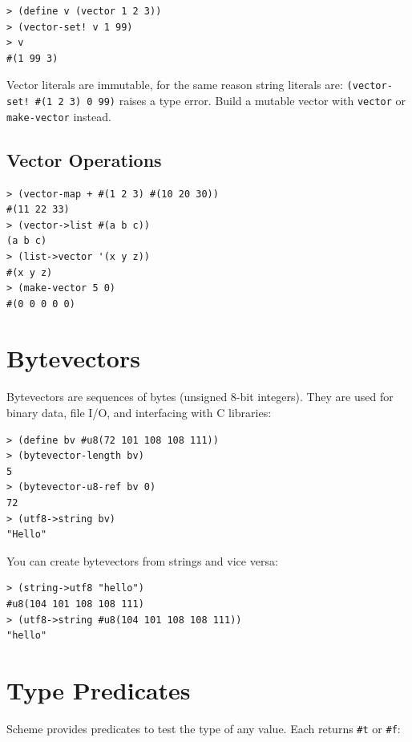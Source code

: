 \begin{lstlisting}[style=repl]
> (define v (vector 1 2 3))
> (vector-set! v 1 99)
> v
#(1 99 3)
\end{lstlisting}

Vector literals are immutable, for the same reason string literals are: \texttt{(vector-set! \#(1 2 3) 0 99)} raises a type error. Build a mutable vector with \texttt{vector} or \texttt{make-vector} instead.

\subsection{Vector Operations}

\begin{lstlisting}[style=repl]
> (vector-map + #(1 2 3) #(10 20 30))
#(11 22 33)
> (vector->list #(a b c))
(a b c)
> (list->vector '(x y z))
#(x y z)
> (make-vector 5 0)
#(0 0 0 0 0)
\end{lstlisting}

\section{Bytevectors}

Bytevectors are sequences of bytes (unsigned 8-bit integers). They are used for binary data, file I/O, and interfacing with C libraries:

\begin{lstlisting}[style=repl]
> (define bv #u8(72 101 108 108 111))
> (bytevector-length bv)
5
> (bytevector-u8-ref bv 0)
72
> (utf8->string bv)
"Hello"
\end{lstlisting}

You can create bytevectors from strings and vice versa:

\begin{lstlisting}[style=repl]
> (string->utf8 "hello")
#u8(104 101 108 108 111)
> (utf8->string #u8(104 101 108 108 111))
"hello"
\end{lstlisting}

\section{Type Predicates}

Scheme provides predicates to test the type of any value. Each returns \texttt{\#t} or \texttt{\#f}:

